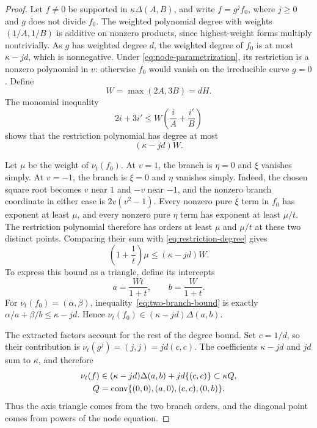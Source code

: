 \begin{proof}
Let $f\ne0$ be supported in $\kappa\Delta(A,B)$, and write $f=g^j f_0$, where $j\ge0$ and $g$ does not divide $f_0$. The weighted polynomial degree with weights $(1/A,1/B)$ is additive on nonzero products, since highest-weight forms multiply nontrivially.  As $g$ has weighted degree $d$, the weighted degree of $f_0$ is at most $\kappa-jd$, which is nonnegative.  Under \eqref{eq:node-parametrization}, its restriction is a nonzero polynomial in $v$: otherwise $f_0$ would vanish on the irreducible curve $g=0$. Define
\begin{equation}\label{eq:normalization-degree-constant}
 W=\max(2A,3B)=dH.
\end{equation}
The monomial inequality
\[
 2i+3i'\le W\left(\frac{i}{A}+\frac{i'}{B}\right)
\]
shows that the restriction polynomial has degree at most
\begin{equation}\label{eq:restriction-degree}
 (\kappa-jd)W.
\end{equation}

Let $\mu$ be the weight of $\nu_t(f_0)$.  At $v=1$, the branch is $\eta=0$ and $\xi$ vanishes simply.  At $v=-1$, the branch is $\xi=0$ and $\eta$ vanishes simply.  Indeed, the chosen square root becomes $v$ near $1$ and $-v$ near $-1$, and the nonzero branch coordinate in either case is $2v(v^2-1)$.  Every nonzero pure $\xi$ term in $f_0$ has exponent at least $\mu$, and every nonzero pure $\eta$ term has exponent at least $\mu/t$.  The restriction polynomial therefore has orders at least $\mu$ and $\mu/t$ at these two distinct points.  Comparing their sum with \eqref{eq:restriction-degree} gives
\begin{equation}\label{eq:two-branch-bound}
 \left(1+\frac1t\right)\mu\le(\kappa-jd)W.
\end{equation}
To express this bound as a triangle, define its intercepts
\begin{equation}\label{eq:node-intercepts}
 a=\frac{Wt}{1+t},\qquad b=\frac{W}{1+t}.
\end{equation}
For $\nu_t(f_0)=(\alpha,\beta)$, inequality~\eqref{eq:two-branch-bound} is exactly $\alpha/a+\beta/b\le\kappa-jd$.  Hence $\nu_t(f_0)\in(\kappa-jd)\Delta(a,b)$.

The extracted factors account for the rest of the degree bound.  Set $c=1/d$, so their contribution is $\nu_t(g^j)=(j,j)=jd(c,c)$.  The coefficients $\kappa-jd$ and $jd$ sum to $\kappa$, and therefore
\begin{equation}\label{eq:node-envelope}
 \begin{split}
 \nu_t(f)&\in(\kappa-jd)\Delta(a,b)+jd\{(c,c)\}\subset\kappa Q,\\
 Q&=\operatorname{conv}\{(0,0),(a,0),(c,c),(0,b)\}.
 \end{split}
\end{equation}
Thus the axis triangle comes from the two branch orders, and the diagonal point comes from powers of the node equation.


\end{proof}
